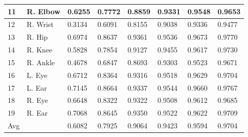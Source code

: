 \documentclass[10pt,letterpaper]{article}
\begin{document}
\begin{table}[!ht]
\begin{adjustwidth}{-2.25in}{0in}
\begin{tabular}{|l|l|l|l|l|l|l|l|}
			11    &  R. Elbow     & 0.6255 & 0.7772 & 0.8859 & 0.9331 & 0.9548 & 0.9653      \\ \hline
			12    &  R. Wrist     & 0.3134 & 0.6091 & 0.8155 & 0.9038 & 0.9336 & 0.9477      \\ \hline
			13    &  R. Hip     & 0.6974 & 0.8637 & 0.9361 & 0.9536 & 0.9673 & 0.9770      \\ \hline
			14    &  R. Knee     & 0.5828 & 0.7854 & 0.9127 & 0.9455 & 0.9617 & 0.9730      \\ \hline
			15    &  R. Ankle     & 0.4678 & 0.6847 & 0.8693 & 0.9303 & 0.9523 & 0.9671      \\ \hline
			16    &  L. Eye     & 0.6712 & 0.8364 & 0.9316 & 0.9518 & 0.9629 & 0.9704      \\ \hline
			17    &  L. Ear     & 0.7145 & 0.8664 & 0.9337 & 0.9544 & 0.9660 & 0.9767      \\ \hline
			18    &  R. Eye     & 0.6648 & 0.8322 & 0.9322 & 0.9508 & 0.9612 & 0.9685      \\ \hline
			19    &  R. Ear     & 0.7068 & 0.8645 & 0.9350 & 0.9522 & 0.9622 & 0.9709      \\ \hline
			Avg  &  &    0.6082 & 0.7925 & 0.9064 & 0.9423 & 0.9594 & 0.9704        \\ \hline
		\end{tabular}
		\label{table:PCKsigma30}
	\end{adjustwidth}
\end{table}
\end{document}
